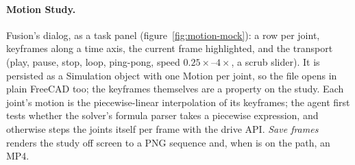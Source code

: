 \paragraph{Motion Study.} Fusion's dialog, as a task panel (figure~\ref{fig:motion-mock}): a row per joint,
keyframes along a time axis, the current frame highlighted, and the transport (play, pause, stop, loop,
ping-pong, speed $0.25\times$--$4\times$, a scrub slider). It is persisted as a Simulation object with one Motion per
joint, so the file opens in plain FreeCAD too; the keyframes themselves are a \code{[BW]} property on the study.
Each joint's motion is the piecewise-linear interpolation of its keyframes; the agent first tests whether the
solver's formula parser takes a piecewise expression, and otherwise steps the joints itself per frame with the
drive API. \emph{Save frames} renders the study off screen to a PNG sequence and, when  is on the
path, an MP4.

